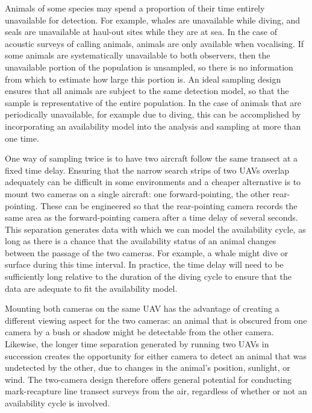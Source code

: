 \documentclass[useAMS, usenatbib, referee]{biom}\usepackage[]{graphicx}\usepackage[]{color}
\begin{document}
Animals of some species may spend a proportion of their time entirely unavailable for detection. For example, whales are unavailable while diving, and seals are unavailable at haul-out sites while they are at sea. In the case of acoustic surveys of calling animals, animals are only available when vocalising. If some animals are systematically unavailable to both observers, then the unavailable portion of the population is unsampled, so there is no information from which to estimate how large this portion is. %
An ideal sampling design ensures that all animals are subject to the same detection model, so that the sample is representative of the entire population. In the case of animals that are periodically unavailable, for example due to diving, this can be accomplished by incorporating an availability model into the analysis and sampling at more than one time.

One way of sampling twice is to have two aircraft follow the same transect at a fixed time delay. Ensuring that the narrow search strips of two UAVs overlap adequately can be difficult in some environments and a cheaper alternative is to mount two cameras on a single aircraft: one forward-pointing, the other rear-pointing. These can be engineered so that the rear-pointing camera records the same area as the forward-pointing camera after a time delay of several seconds. This separation generates data with which we can model the availability cycle, as long as there is a chance that the availability status of an animal changes between the passage of the two cameras. For example, a whale might dive or surface during this time interval. In practice, the time delay will need to be sufficiently long relative to the duration of the diving cycle to ensure that the data are adequate to fit the availability model.

Mounting both cameras on the same UAV has the advantage of creating a different viewing aspect for the two cameras: an animal that is obscured from one camera by a bush or shadow might be detectable from the other camera. Likewise, the longer time separation generated by running two UAVs in succession creates the opportunity for either camera to detect an animal that was undetected by the other, due to changes in the animal's position, sunlight, or wind. The two-camera design therefore offers general potential for conducting mark-recapture line transect surveys from the air, regardless of whether or not an availability cycle is involved.
\end{document}
